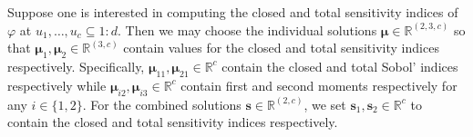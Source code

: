 \documentclass[graybox]{svmult}
\begin{document}
Suppose one is interested in computing the closed and total sensitivity indices of $\varphi$ at $u_1,\dots,u_c \subseteq 1:d$. Then we may choose the individual solutions $\boldsymbol{\mu} \in \mathbb{R}^{(2, 3, c)}$ so that
$\boldsymbol{\mu}_1,\boldsymbol{\mu}_2 \in \mathbb{R}^{(3,c)}$ contain values for the closed and total sensitivity indices respectively. Specifically,  $\boldsymbol{\mu}_{11},\boldsymbol{\mu}_{21} \in \mathbb{R}^c$ contain the closed and total Sobol' indices respectively while $\boldsymbol{\mu}_{i2}, \boldsymbol{\mu}_{i3} \in \mathbb{R}^c$ contain first and second moments respectively for any $i \in \{1,2\}$. For the combined solutions $\boldsymbol{s} \in \mathbb{R}^{(2, c)}$, we set $\boldsymbol{s}_1, \boldsymbol{s}_2 \in \mathbb{R}^c$ to contain the closed and total sensitivity indices respectively. 
\end{document}
